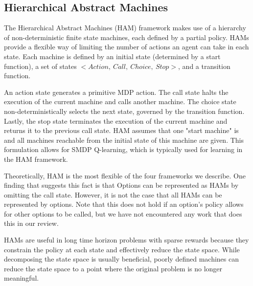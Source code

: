 \subsection{Hierarchical Abstract Machines}
The Hierarchical Abstract Machines (HAM) framework \cite{Parr} makes use of a hierarchy of
non-deterministic finite state machines, each defined by a partial policy.
HAMs provide a flexible way of limiting the number of actions an agent can take in each state.
Each machine is defined by an initial state (determined by a start function),
a set of states $<Action,\ Call,\ Choice,\ Stop>$, and a transition function.

An action state generates a primitive MDP action. The call state halts the
execution of the current machine and calls another
machine. The choice state non-deterministically selects the next state, governed by the transition function. Lastly, the
stop state terminates the execution of the current machine and returns it to the previous call state.
HAM assumes that one "start machine" is and all machines reachable from the initial state of this machine are given.
This formulation allows for SMDP Q-learning, which is typically used for learning in the HAM framework.

Theoretically, HAM is the most flexible of the four frameworks we describe.
One finding that suggests this fact is that Options can be represented
as HAMs by omitting the call state. However, it is not the case that all HAMs can be represented by
options. Note that this does not hold if an option's policy allows for other options to be called, but we
have not encountered any work that does this in our review.

HAMs are useful in long time horizon problems with sparse rewards because they
constrain the policy at each state and effectively reduce the state space.
While decomposing the state space is usually beneficial,
poorly defined machines can reduce the state space to a point where the
original problem is no longer meaningful.
